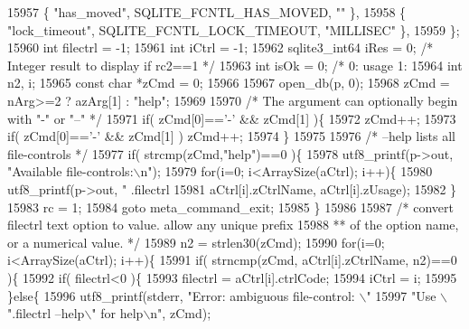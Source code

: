 \begin{DoxyCode}
{{{{{{{{{{{{{15957       \{ \textcolor{stringliteral}{"has\_moved"},      SQLITE_FCNTL_HAS_MOVED,       \textcolor{stringliteral}{""}               \},  
15958       \{ \textcolor{stringliteral}{"lock\_timeout"},   SQLITE_FCNTL_LOCK_TIMEOUT,    \textcolor{stringliteral}{"MILLISEC"}       \},
15959     \};
15960     \textcolor{keywordtype}{int} filectrl = -1;
15961     \textcolor{keywordtype}{int} iCtrl = -1;
15962     sqlite3_int64 iRes = 0;  \textcolor{comment}{/* Integer result to display if rc2==1 */}
15963     \textcolor{keywordtype}{int} isOk = 0;            \textcolor{comment}{/* 0: usage  1: %
15964     \textcolor{keywordtype}{int} n2, i;
15965     \textcolor{keyword}{const} \textcolor{keywordtype}{char} *zCmd = 0;
15966 
15967     open_db(p, 0);
15968     zCmd = nArg>=2 ? azArg[1] : \textcolor{stringliteral}{"help"};
15969 
15970     \textcolor{comment}{/* The argument can optionally begin with "-" or "--" */}
15971     \textcolor{keywordflow}{if}( zCmd[0]==\textcolor{charliteral}{'-'} && zCmd[1] )\{
15972       zCmd++;
15973       \textcolor{keywordflow}{if}( zCmd[0]==\textcolor{charliteral}{'-'} && zCmd[1] ) zCmd++;
15974     \}
15975 
15976     \textcolor{comment}{/* --help lists all file-controls */}
15977     \textcolor{keywordflow}{if}( strcmp(zCmd,\textcolor{stringliteral}{"help"})==0 )\{
15978       utf8_printf(p->out, \textcolor{stringliteral}{"Available file-controls:\(\backslash\)n"});
15979       \textcolor{keywordflow}{for}(i=0; i<ArraySize(aCtrl); i++)\{
15980         utf8_printf(p->out, \textcolor{stringliteral}{"  .filectrl %
15981                     aCtrl[i].zCtrlName, aCtrl[i].zUsage);
15982       \}
15983       rc = 1;
15984       \textcolor{keywordflow}{goto} meta\_command\_exit;
15985     \}
15986 
15987     \textcolor{comment}{/* convert filectrl text option to value. allow any unique prefix}
15988 \textcolor{comment}{    ** of the option name, or a numerical value. */}
15989     n2 = strlen30(zCmd);
15990     \textcolor{keywordflow}{for}(i=0; i<ArraySize(aCtrl); i++)\{
15991       \textcolor{keywordflow}{if}( strncmp(zCmd, aCtrl[i].zCtrlName, n2)==0 )\{
15992         \textcolor{keywordflow}{if}( filectrl<0 )\{
15993           filectrl = aCtrl[i].ctrlCode;
15994           iCtrl = i;
15995         \}\textcolor{keywordflow}{else}\{
15996           utf8_printf(stderr, \textcolor{stringliteral}{"Error: ambiguous file-control: \(\backslash\)"%
15997                               \textcolor{stringliteral}{"Use \(\backslash\)".filectrl --help\(\backslash\)" for help\(\backslash\)n"}, zCmd);
}}}}}}}}}}}}}}}}
\end{DoxyCode}
